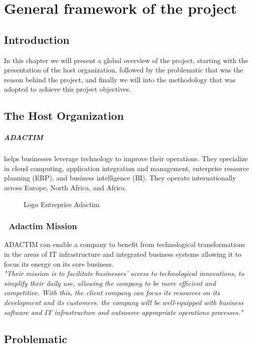 \chapter{General framework of the project}
\section*{Introduction}
In this chapter we will present a global overview of the project, starting with the presentation of the host organization, followed by the problematic that was the reason behind the project, and finally we will into the methodology that was adopted to achieve this project objectives.
\section{The Host Organization}
\paragraph[short]{ADACTIM}
helps businesses leverage technology to improve their operations. They specialize in cloud computing, application integration and management, enterprise resource planning (ERP), and business intelligence (BI).  They operate internationally across Europe, North Africa, and Africa.

\begin{figure}[H]
    \centering
    \caption{Logo Entreprise Adactim}
    \label{fig:logo_Adactim}
\end{figure}

\subsection*{ \textbullet\ Adactim  Mission}
ADACTIM can enable a company to benefit from technological transformations in the areas of IT infrastructure and integrated business systems allowing it to focus its energy on its core business.
\\
\emph{"Their mission is to facilitate businesses' access to technological innovations, to simplify their daily use, allowing the company to be more efficient and competitive.
With this, the client company can focus its resources on its development and its customers. the company will be well-equipped with business software and IT infrastructure and outsource appropriate operations processes."}\cite{adactim}
\section{Problematic}

